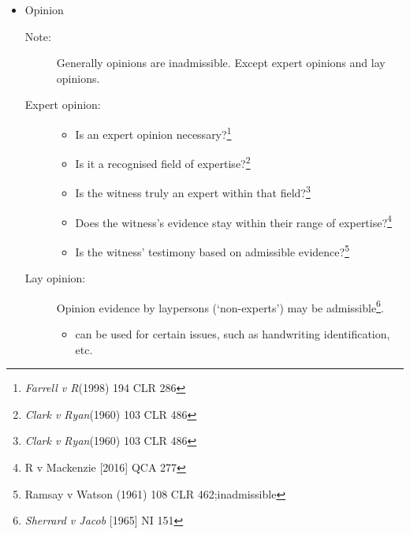 \begin{itemize}
    \item Opinion
        \begin{description}
            \item[Note:] Generally opinions are inadmissible. Except expert opinions and lay opinions.
            \item[Expert opinion:]
                \begin{itemize}
                    \item Is an expert opinion necessary?\footnote{\textit{Farrell v R}(1998) 194 CLR 286}
                    \item Is it a recognised field of expertise?\footnote{\textit{Clark v Ryan}(1960) 103 CLR 486}
                    \item Is the witness truly an expert within that field?\footnote{\textit{Clark v Ryan}(1960) 103 CLR 486}
                    \item Does the witness’s evidence stay within their range of expertise?\footnote{R v Mackenzie [2016] QCA 277}
                    \item Is the witness’ testimony based on admissible evidence?\footnote{Ramsay v Watson (1961) 108 CLR 462;inadmissible}
                \end{itemize}
                
            \item[Lay opinion:]Opinion evidence by laypersons (‘non-experts’) may be admissible\footnote{\textit{Sherrard v Jacob }[1965] NI 151}.
                \begin{itemize}
                    \item can be used for certain issues, such as handwriting identification, etc. 
                \end{itemize}
        \end{description}
        

\end{itemize}
